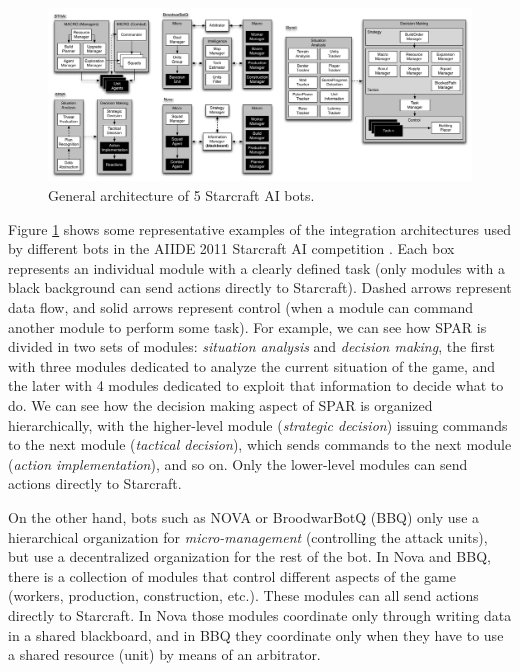 \documentclass[journal]{IEEEtran}
\begin{document}
\begin{figure}[ta]
    \centering
    \includegraphics[width=\textwidth]{figures/figure-bot-architectures-wide.pdf}
    \caption{General architecture of 5 Starcraft AI bots.}
    \label{fig:bot-architecture}
\end{figure}

Figure \ref{fig:bot-architecture} shows some representative examples of the integration architectures used by different bots in the AIIDE 2011 Starcraft AI competition \cite{url1}. Each box represents an individual module with a clearly defined task (only modules with a black background can send actions directly to Starcraft). Dashed arrows represent data flow, and solid arrows represent control (when a module can command another module to perform some task). For example, we can see how SPAR is divided in two sets of modules: {\em situation analysis} and {\em decision making}, the first with three modules dedicated to analyze the current situation of the game, and the later with 4 modules dedicated to exploit that information to decide what to do. We can see how the decision making aspect of SPAR is organized hierarchically, with the higher-level module ({\em strategic decision}) issuing commands to the next module ({\em tactical decision}), which sends commands to the next module ({\em action implementation}), and so on. Only the lower-level modules can send actions directly to Starcraft. 

On the other hand, bots such as NOVA or BroodwarBotQ (BBQ) only use a hierarchical organization for {\em micro-management} (controlling the attack units), but use a decentralized organization for the rest of the bot. In Nova and BBQ, there is a collection of modules that control different aspects of the game (workers, production, construction, etc.). These modules can all send actions directly to Starcraft. In Nova those modules coordinate only through writing data in a shared blackboard, and in BBQ they coordinate only when they have to use a shared resource (unit) by means of an arbitrator.
\end{document}
